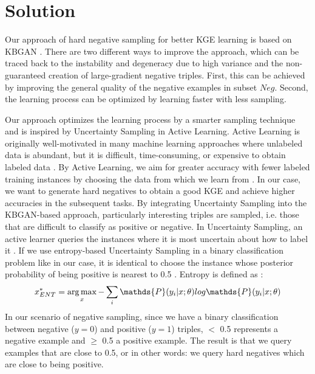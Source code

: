 \chapter{Solution}
\label{ch:solution}

Our approach of hard negative sampling for better \ac{KGE} learning is based on \ac{KBGAN} \cite{cai2017kbgan}.
There are two different ways to improve the approach, which can be traced back to the instability and degeneracy due to high variance and the non-guaranteed creation of large-gradient negative triples.
First, this can be achieved by improving the general quality of the negative examples in subset $Neg$.
Second, the learning process can be optimized by learning faster with less sampling.

Our approach optimizes the learning process by a smarter sampling technique and is inspired by Uncertainty Sampling in Active Learning.
Active Learning is originally well-motivated in many machine learning approaches where unlabeled data is abundant, but it is difficult, time-consuming, or expensive to obtain labeled data \cite{Settles2009ActiveLL}.
By Active Learning, we aim for greater accuracy with fewer labeled training instances by choosing the data from which we learn from \cite{Settles2009ActiveLL}.
In our case, we want to generate hard negatives to obtain a good \ac{KGE} and achieve higher accuracies in the subsequent tasks. 
By integrating Uncertainty Sampling into the \ac{KBGAN}-based approach, particularly interesting triples are sampled, i.e. those that are difficult to classify as positive or negative.
In Uncertainty Sampling, an active learner queries the instances where it is most uncertain about how to label it \cite{Settles2009ActiveLL}.
If we use entropy-based Uncertainty Sampling in a binary classification problem like in our case, it is identical to choose the instance whose posterior probability of being positive is nearest to 0.5 \cite{Settles2009ActiveLL}.
Entropy is defined as \cite{Settles2009ActiveLL}:
$$x^{*}_{ENT} = \argmax_{x} - \sum_{i}{\mathds{P}(y_i | x; \theta) log \mathds{P}(y_i|x; \theta)}$$
In our scenario of negative sampling, since we have a binary classification between negative ($y=0$) and positive ($y=1$) triples, $<$ 0.5 represents a negative example and $\geq$ 0.5 a positive example.
The result is that we query examples that are close to 0.5, or in other words: we query hard negatives which are close to being positive.


